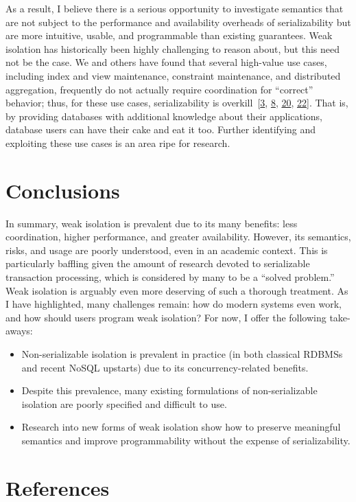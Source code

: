 \documentclass[b5paper,11pt,twoside,openright]{book}
\newcommand\Section[2]{
  \hypertarget{#1}{
    \section{#2}\label{#1}
  }
}
\begin{document}
As a result, I believe there is a serious opportunity to investigate
semantics that are not subject to the performance and availability
overheads of serializability but are more intuitive, usable, and
programmable than existing guarantees. Weak isolation has historically
been highly challenging to reason about, but this need not be the case.
We and others have found that several high-value use cases, including
index and view maintenance, constraint maintenance, and distributed
aggregation, frequently do not actually require coordination for
``correct'' behavior; thus, for these use cases, serializability is
overkill~{{[}\protect\hyperlink{ref-bailis-phd}{3},
  \protect\hyperlink{ref-ramp}{8},
  \protect\hyperlink{ref-homeostasis}{20},
  \protect\hyperlink{ref-crdt}{22}{]}}. That is, by providing databases
with additional knowledge about their applications, database users can
have their cake and eat it too. Further identifying and exploiting these
use cases is an area ripe for research.

\Section{conclusions}{
Conclusions
}

In summary, weak isolation is prevalent due to its many benefits: less
coordination, higher performance, and greater availability. However, its
semantics, risks, and usage are poorly understood, even in an academic
context. This is particularly baffling given the amount of research
devoted to serializable transaction processing, which is considered by
many to be a ``solved problem.'' Weak isolation is arguably even more
deserving of such a thorough treatment. As I have highlighted, many
challenges remain: how do modern systems even work, and how should users
program weak isolation? For now, I offer the following take-aways:

\begin{itemize}
  \item
  Non-serializable isolation is prevalent in practice (in both classical
  RDBMSs and recent NoSQL upstarts) due to its concurrency-related
  benefits.
  \item
  Despite this prevalence, many existing formulations of
  non-serializable isolation are poorly specified and difficult to use.
  \item
  Research into new forms of weak isolation show how to preserve
  meaningful semantics and improve programmability without the expense
  of serializability.
\end{itemize}

\section*{References}
\end{document}
